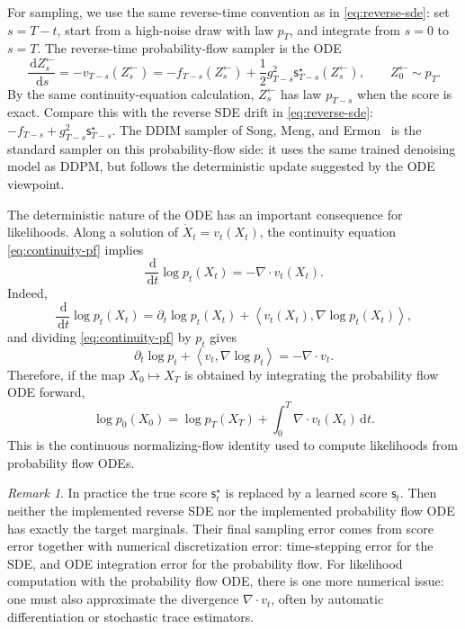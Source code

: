 \documentclass{amsart}
\numberwithin{equation}{section}
\theoremstyle{plain}
\theoremstyle{definition}
\theoremstyle{remark}
\newtheorem*{remark}{Remark}
\newcommand{\dd}{\,\mathrm{d}}
\newcommand{\ip}[2]{\left\langle #1,#2 \right\rangle}
\newcommand{\sstar}{\mathsf{s}^{\star}}
\newcommand{\score}{\mathsf{s}}
\begin{document}
For sampling, we use the same reverse-time convention as in
\eqref{eq:reverse-sde}: set $s=T-t$, start from a high-noise draw with law
$p_T$, and integrate from $s=0$ to $s=T$.  The reverse-time probability-flow
sampler is the ODE
\[
    \frac{\dd Z^{\leftarrow}_s}{\dd s}
    =
    -v_{T-s}(Z^{\leftarrow}_s)
    =
    -f_{T-s}(Z^{\leftarrow}_s)
    +\frac12 g_{T-s}^2\sstar_{T-s}(Z^{\leftarrow}_s),
    \qquad Z^{\leftarrow}_0\sim p_T.
\]
By the same continuity-equation calculation, $Z^{\leftarrow}_s$ has law $p_{T-s}$
when the score is exact.
Compare this with the reverse SDE drift in \eqref{eq:reverse-sde}: $ -f_{T-s}+g_{T-s}^2\sstar_{T-s}$.
The DDIM sampler of Song, Meng, and Ermon~\cite{song2021ddim} is the
standard sampler on this probability-flow side: it uses the same trained
denoising model as DDPM, but follows the deterministic update suggested by the
ODE viewpoint.

The deterministic nature of the ODE has an important consequence for
likelihoods.  Along a solution of $\dot X_t=v_t(X_t)$, the continuity equation
\eqref{eq:continuity-pf} implies
\begin{equation}\label{eq:instantaneous-change}
    \frac{\dd}{\dd t}\log p_t(X_t)
    =
    -\nabla\cdot v_t(X_t).
\end{equation}
Indeed,
\[
    \frac{\dd}{\dd t}\log p_t(X_t)
    =
    \partial_t\log p_t(X_t)+
    \ip{v_t(X_t)}{\nabla\log p_t(X_t)},
\]
and dividing \eqref{eq:continuity-pf} by $p_t$ gives
\[
    \partial_t\log p_t+\ip{v_t}{\nabla\log p_t}
    =
    -\nabla\cdot v_t.
\]
Therefore, if the map $X_0\mapsto X_T$ is obtained by integrating the
probability flow ODE forward,
\[
    \log p_0(X_0)
    =
    \log p_T(X_T)
    +
    \int_0^T \nabla\cdot v_t(X_t)\dd t.
\]
This is the continuous normalizing-flow identity used to compute likelihoods
from probability flow ODEs.


\begin{remark}
In practice the true score $\sstar_t$ is replaced by a learned score
$\score_t$.  Then neither the implemented reverse SDE nor the implemented
probability flow ODE has exactly the target marginals.  Their final sampling
error comes from score error together with numerical discretization error:
time-stepping error for the SDE, and ODE integration error for the probability
flow.  For likelihood computation with the probability flow ODE, there is one
more numerical issue: one must also approximate the divergence
$\nabla\cdot v_t$, often by automatic differentiation or stochastic trace
estimators.
\end{remark}
\end{document}
